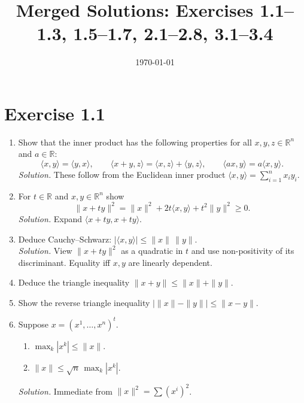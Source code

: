 \documentclass[11pt,a4paper]{article}
\title{Merged Solutions: Exercises 1.1--1.3, 1.5--1.7, 2.1--2.8, 3.1--3.4}
\author{}
\date{\today}
\begin{document}
\maketitle

\section*{Exercise 1.1}
\begin{enumerate}
\renewcommand\labelenumi{(\alph{enumi})}
\item Show that the inner product has the following properties for all $x,y,z\in\mathbb{R}^n$ and $a\in\mathbb{R}$:
\[
\langle x,y\rangle=\langle y,x\rangle,\qquad
\langle x+y,z\rangle=\langle x,z\rangle+\langle y,z\rangle,\qquad
\langle ax,y\rangle=a\langle x,y\rangle.
\]
\textit{Solution.} These follow from the Euclidean inner product $\langle x,y\rangle=\sum_{i=1}^n x_i y_i$.

\item For $t\in\mathbb{R}$ and $x,y\in\mathbb{R}^n$ show
\[
\|x+ty\|^2=\|x\|^2+2t\langle x,y\rangle+t^2\|y\|^2\ge 0.
\]
\textit{Solution.} Expand $\langle x+ty,x+ty\rangle$.

\item Deduce Cauchy--Schwarz: $|\langle x,y\rangle|\le \|x\|\,\|y\|$.\\
\textit{Solution.} View $\|x+ty\|^2$ as a quadratic in $t$ and use non-positivity of its discriminant.
Equality iff $x,y$ are linearly dependent.

\item Deduce the triangle inequality $\|x+y\|\le \|x\|+\|y\|$.

\item Show the reverse triangle inequality $|\|x\|-\|y\||\le \|x-y\|$.

\item Suppose $x=(x^1,\dots,x^n)^t$.
\begin{enumerate}
\renewcommand\labelenumii{(\roman{enumii})}
\item $\displaystyle \max_{k}|x^k|\le \|x\|$.
\item $\displaystyle \|x\|\le \sqrt{n}\,\max_{k}|x^k|$.
\end{enumerate}
\textit{Solution.} Immediate from $\|x\|^2=\sum (x^i)^2$.
\end{enumerate}
\end{document}
